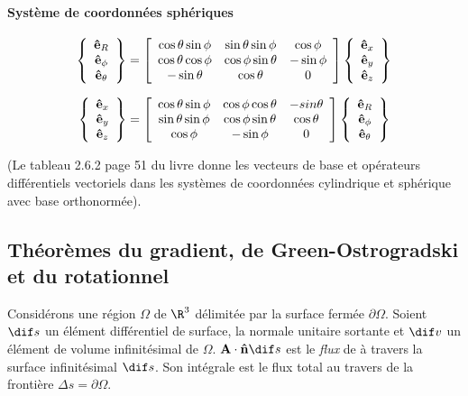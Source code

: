 \paragraph{Système de coordonnées sphériques}
$$\left\{\begin{array}{c}
\textbf{ê}_R\\
\textbf{ê}_{\phi}\\
\textbf{ê}_{\theta}
\end{array}\right\}=
\left[\begin{array}{ccc}
\cos\theta\sin\phi&\sin\theta\sin\phi&\cos\phi\\
\cos\theta\cos\phi&\cos\phi\sin\theta&-\sin\phi\\
-\sin\theta&\cos\theta&0
\end{array}\right]
\left\{\begin{array}{c}
\textbf{ê}_x\\
\textbf{ê}_y\\
\textbf{ê}_z
\end{array}\right\}$$

$$\left\{\begin{array}{c}
\textbf{ê}_x\\
\textbf{ê}_{y}\\
\textbf{ê}_z
\end{array}\right\}=
\left[\begin{array}{ccc}
\cos\theta\sin\phi&\cos\phi\cos\theta&-sin\theta\\
\sin\theta\sin\phi&\cos\phi\sin\theta&\cos\theta\\
\cos\phi&-\sin\phi&0
\end{array}\right]
\left\{\begin{array}{c}
\textbf{ê}_R\\
\textbf{ê}_{\phi}\\
\textbf{ê}_{\theta}
\end{array}\right\}$$

(Le tableau 2.6.2 page 51 du livre donne les vecteurs de base et opérateurs différentiels vectoriels dans les systèmes de coordonnées cylindrique et sphérique avec base orthonormée).

\subsection{Théorèmes du gradient, de Green-Ostrogradski et du rotationnel}

Considérons une région $\Omega$ de $\R^3$ délimitée par la surface fermée $\partial \Omega$.
Soient $\dif s$ un élément différentiel de surface,
 la normale unitaire sortante et $\dif v$ un élément de volume infinitésimal de $\Omega$.
$\sp{\fv{A}}{\fv{\^n}} \dif s$ est le \emph{flux} de  à travers la surface infinitésimal $\dif s$.
Son intégrale est le flux total au travers de la frontière $\Delta s=\partial\Omega$.


